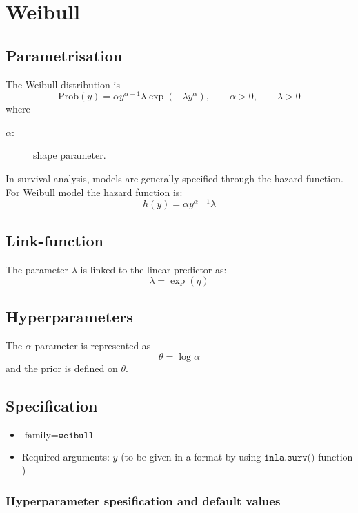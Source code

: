 \documentclass[a4paper,11pt]{article}
\begin{document}
\section*{Weibull}

\subsection*{Parametrisation}

The Weibull distribution is
\begin{displaymath}
    \text{Prob}(y) = \alpha y^{\alpha-1}
    \lambda\exp( - \lambda  y^{\alpha}),
    \qquad \alpha>0, \qquad \lambda>0
\end{displaymath}
where
\begin{description}
\item[$\alpha$:] shape parameter.
\end{description}
In survival analysis, models are generally specified through the
hazard function. For Weibull model the hazard function is:
\begin{displaymath}
    h(y)  = \alpha y^{\alpha-1} \lambda
\end{displaymath}

\subsection*{Link-function}

The parameter $\lambda$ is linked to the linear predictor as:
\[
\lambda = \exp(\eta)
\]
\subsection*{Hyperparameters}

The $\alpha$ parameter is represented as
\[
\theta = \log\alpha
\]
and the prior is defined on $\theta$.

\subsection*{Specification}

\begin{itemize}
\item $\text{family}=\texttt{weibull}$
\item Required arguments: $y$ (to be given in a format by using
    $\texttt{inla.surv()}$ function )
\end{itemize}

\subsubsection*{Hyperparameter spesification and default values}

\end{document}
